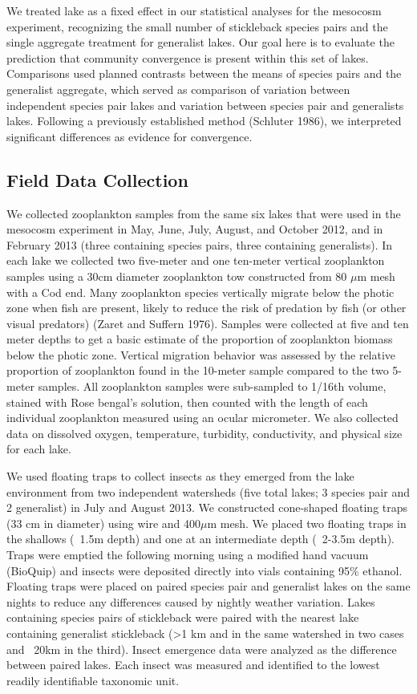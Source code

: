 \documentclass[11pt]{article}
\begin{document}
We treated lake as a fixed effect in our statistical analyses for the mesocosm experiment, recognizing the small number of stickleback species pairs and the single aggregate treatment for generalist lakes. Our goal here is to evaluate the prediction that community convergence is present within this set of lakes. Comparisons used planned contrasts between the means of species pairs and the generalist aggregate, which served as comparison of variation between independent species pair lakes and variation between species pair and generalists lakes.  Following a previously established method (Schluter 1986), we interpreted significant differences as evidence for convergence.  

\subsection*{Field Data Collection}

We collected zooplankton samples from the same six lakes that were used in the mesocosm experiment in May, June, July, August, and October 2012, and in February 2013 (three containing species pairs, three containing generalists).  In each lake we collected two five-meter and one ten-meter vertical zooplankton samples using a 30cm diameter zooplankton tow constructed from 80 $\mu$m mesh with a Cod end.  Many zooplankton species vertically migrate below the photic zone when fish are present, likely to reduce the risk of predation by fish (or other visual predators) (Zaret and Suffern 1976).  Samples were collected at five and ten meter depths to get a basic estimate of the proportion of zooplankton biomass below the photic zone.   Vertical migration behavior was assessed by the relative proportion of zooplankton found in the 10-meter sample compared to the two 5-meter samples.   All zooplankton samples were sub-sampled to 1/16th volume, stained with Rose bengal’s solution, then counted with the length of each individual zooplankton measured using an ocular micrometer.  We also collected data on dissolved oxygen, temperature, turbidity, conductivity, and physical size for each lake.     

We used floating traps to collect insects as they emerged from the lake environment from two independent watersheds (five total lakes; 3 species pair and 2 generalist) in July and August 2013.  We constructed cone-shaped floating traps (33 cm in diameter) using wire and 400$\mu$m mesh.  We placed two floating traps in the shallows (~1.5m depth) and one at an intermediate depth (~2-3.5m depth).  Traps were emptied the following morning using a modified hand vacuum (BioQuip) and insects were deposited directly into vials containing 95\% ethanol.  Floating traps were placed on paired species pair and generalist lakes on the same nights to reduce any differences caused by nightly weather variation.  Lakes containing species pairs of stickleback were paired with the nearest lake containing generalist stickleback (>1 km and in the same watershed in two cases and ~20km in the third).  Insect emergence data were analyzed as the difference between paired lakes. Each insect was measured and identified to the lowest readily identifiable taxonomic unit.  
\end{document}
